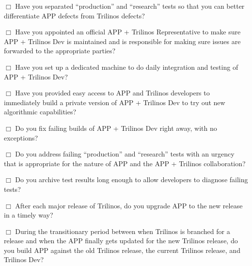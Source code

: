 \documentclass[pdf,ps2pdf,11pt]{SANDreport}
\begin{document}
$\Box$ Have you separated ``production'' and ``research'' tests so that you
can better differentiate APP defects from Trilinos defects?

$\Box$ Have you appointed an official APP + Trilinos Representative to make
sure APP + Trilinos Dev is maintained and is responsible for making sure
issues are forwarded to the appropriate parties?

$\Box$ Have you set up a dedicated machine to do daily integration and testing
of APP + Trilinos Dev?

$\Box$ Have you provided easy access to APP and Trilinos developers to
immediately build a private version of APP + Trilinos Dev to try out new
algorithmic capabilities?

$\Box$ Do you fix failing builds of APP + Trilinos Dev right away, with no
exceptions?

$\Box$ Do you address failing ``production'' and ``research'' tests with an
urgency that is appropriate for the nature of APP and the APP + Trilinos
collaboration?

$\Box$ Do you archive test results long enough to allow developers to diagnose
failing tests?

$\Box$ After each major release of Trilinos, do you upgrade APP to the new
release in a timely way?

$\Box$ During the transitionary period between when Trilinos is branched for a
release and when the APP finally gets updated for the new Trilinos release, do
you build APP against the old Trilinos release, the current Trilinos release,
and Trilinos Dev?



\begin{SANDdistribution}[NM]
\end{SANDdistribution}
\end{document}
